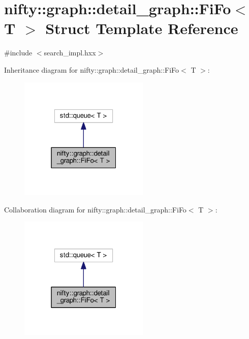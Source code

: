 \hypertarget{structnifty_1_1graph_1_1detail__graph_1_1FiFo}{}\section{nifty\+:\+:graph\+:\+:detail\+\_\+graph\+:\+:Fi\+Fo$<$ T $>$ Struct Template Reference}
\label{structnifty_1_1graph_1_1detail__graph_1_1FiFo}


{\ttfamily \#include $<$search\+\_\+impl.\+hxx$>$}



Inheritance diagram for nifty\+:\+:graph\+:\+:detail\+\_\+graph\+:\+:Fi\+Fo$<$ T $>$\+:\nopagebreak
\begin{figure}[H]
\begin{center}
\leavevmode
\includegraphics[width=175pt]{structnifty_1_1graph_1_1detail__graph_1_1FiFo__inherit__graph}
\end{center}
\end{figure}


Collaboration diagram for nifty\+:\+:graph\+:\+:detail\+\_\+graph\+:\+:Fi\+Fo$<$ T $>$\+:\nopagebreak
\begin{figure}[H]
\begin{center}
\leavevmode
\includegraphics[width=175pt]{structnifty_1_1graph_1_1detail__graph_1_1FiFo__coll__graph}
\end{center}
\end{figure}
